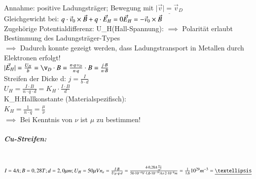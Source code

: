         Annahme: positive Ladungsträger; Bewegung mit $\underline{\vert \vec{v}\vert=\vec{v}_D}$\\
        Gleichgewicht bei: $q\cdot \vec{v}_0\times \vec{B}+q\cdot\vec{E}_H=0\\ \vec{E}_H=-\vec{v}_0\times\vec{B}$\\
        
        Zugehörige Potentialdifferenz: U_H(Hall-Spannung):
        $\implies$ Polarität erlaubt Bestimmung des Ladungsträger-Types\\
        $\implies$ Dadurch konnte gezeigt werden, dass Ladungstransport in Metallen durch Elektronen erfolgt!\\
        
        $\vert \vec{E}_H\vert=\frac{U_H}{b}=\v_D\cdot B=\frac{n\cdot q\cdot v_D}{n\cdot q}\cdot B=\frac{j\cdot B}{n\cdot B}$\\
        
        Streifen der Dicke d: $j=\frac{I}{b\cdot d}$\\
        
        $U_H=\frac{I\cdot B}{n\cdot q\cdot d}=K_H\cdot\frac{I\cdot B}{d}$\\
        
        K_H:Hallkonstante (Materialspezifisch):\\
        $\boxed{K_H=\frac{1}{n\cdot q}=\frac{\mu}{\nu}}$\\
        
        $\implies$ Bei Kenntnis von $\nu$ ist $\mu$ zu bestimmen!
        
        \subparagraph{Cu-Streifen:}\leavevmode \\
        
        $I=4A; B=0,28T; d=2,0\mu m; U_H=50\mu V\\
        n_e=\frac{I\cdot B}{U_H\cdot q\cdot d}=\frac{4\cdot 0,28 A\frac{Vs}{m^2}}{50\cdot 10^{-4}V\cdot 1,6\cdot 10^{-19}As\cdot 2\cdot 10^{-6}m}\\
        =\frac{1}{1,6}10^{29}m^{-3}\\
        =\underline{…}$\\
        
        
        
        
        
        
        
        
        
        
        
        
        
        
        
\newpage  